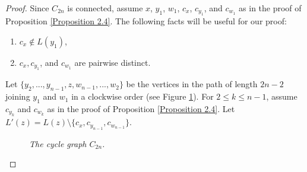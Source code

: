 \documentclass[12pt,reqno,a4paper]{amsart}
\theoremstyle{definition}
\begin{document}
\begin{proof}
Since $C_{2n}$ is connected, assume $x$, $y_{1}$, $w_{1}$, $c_{x}$, $c_{y_{1}}$, and $c_{w_{1}}$ as in the proof of Proposition \ref{Proposition 2.4}. The following facts will be useful for our proof:

\begin{enumerate}
    \item[$(a)$] $c_{x}\not\in L(y_{1})$,
    \item[$(b)$] $c_{x}, c_{y_{1}}$, and $c_{w_{1}}$ are pairwise distinct.
\end{enumerate}

Let $\{y_{2},...,y_{n-1}, z, w_{n-1},...,w_{2}\}$ be the vertices in the path of length $2n-2$ joining $y_{1}$ and $w_{1}$ in a clockwise order (see Figure \ref{Figure 3}). For $2\leq k\leq n-1$, assume $c_{y_{k}}$ and $c_{w_{k}}$ as in the proof of Proposition \ref{Proposition 2.4}.
Let $L'(z)= L(z)\setminus \{c_x,c_{y_{n-1}}, c_{w_{n-1}}\}$.

\begin{figure}[!ht]
\centering
\begin{minipage}{\textwidth}
\centering
{}
\end{minipage}
\caption{\em The cycle graph $C_{2n}$.}
\label{Figure 3}
\end{figure}


\end{proof}
\end{document}
